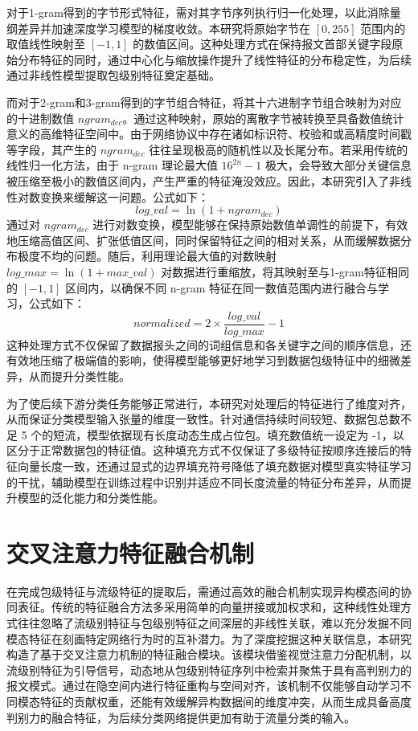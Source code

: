 对于1-gram得到的字节形式特征，需对其字节序列执行归一化处理，以此消除量纲差异并加速深度学习模型的梯度收敛。本研究将原始字节在 $[0, 255]$ 范围内的取值线性映射至 $[-1, 1]$ 的数值区间。这种处理方式在保持报文首部关键字段原始分布特征的同时，通过中心化与缩放操作提升了线性特征的分布稳定性，为后续通过非线性模型提取包级别特征奠定基础。

而对于2-gram和3-gram得到的字节组合特征，将其十六进制字节组合映射为对应的十进制数值 $ngram_{dec}$。通过这种映射，原始的离散字节被转换至具备数值统计意义的高维特征空间中。由于网络协议中存在诸如标识符、校验和或高精度时间戳等字段，其产生的 $ngram_{dec}$ 往往呈现极高的随机性以及长尾分布。若采用传统的线性归一化方法，由于 n-gram 理论最大值 $16^{2n}-1$ 极大，会导致大部分关键信息被压缩至极小的数值区间内，产生严重的特征淹没效应。因此，本研究引入了非线性对数变换来缓解这一问题。公式如下：
\begin{equation}
  log\_val = \ln(1 + ngram_{dec})
  \label{eq:log}
\end{equation}
通过对 $ngram_{dec}$ 进行对数变换，模型能够在保持原始数值单调性的前提下，有效地压缩高值区间、扩张低值区间，同时保留特征之间的相对关系，从而缓解数据分布极度不均的问题。随后，利用理论最大值的对数映射 $log\_max = \ln(1 + max\_val)$ 对数据进行重缩放，将其映射至与1-gram特征相同的 $[-1, 1]$ 区间内，以确保不同 n-gram 特征在同一数值范围内进行融合与学习，公式如下：
\begin{equation}
  normalized = 2 \times \frac{log\_val}{log\_max} - 1
  \label{eq:normalized}
\end{equation}
这种处理方式不仅保留了数据报头之间的词组信息和各关键字之间的顺序信息，还有效地压缩了极端值的影响，使得模型能够更好地学习到数据包级特征中的细微差异，从而提升分类性能。

为了使后续下游分类任务能够正常进行，本研究对处理后的特征进行了维度对齐，从而保证分类模型输入张量的维度一致性。针对通信持续时间较短、数据包总数不足 5 个的短流，模型依据现有长度动态生成占位包。填充数值统一设定为 -1，以区分于正常数据包的特征值。这种填充方式不仅保证了多级特征按顺序连接后的特征向量长度一致，还通过显式的边界填充符号降低了填充数据对模型真实特征学习的干扰，辅助模型在训练过程中识别并适应不同长度流量的特征分布差异，从而提升模型的泛化能力和分类性能。

\section{交叉注意力特征融合机制}
在完成包级特征与流级特征的提取后，需通过高效的融合机制实现异构模态间的协同表征。传统的特征融合方法多采用简单的向量拼接或加权求和，这种线性处理方式往往忽略了流级别特征与包级别特征之间深层的非线性关联，难以充分发掘不同模态特征在刻画特定网络行为时的互补潜力。为了深度挖掘这种关联信息，本研究构造了基于交叉注意力机制的特征融合模块。该模块借鉴视觉注意力分配机制，以流级别特征为引导信号，动态地从包级别特征序列中检索并聚焦于具有高判别力的报文模式。通过在隐空间内进行特征重构与空间对齐，该机制不仅能够自动学习不同模态特征的贡献权重，还能有效缓解异构数据间的维度冲突，从而生成具备高度判别力的融合特征，为后续分类网络提供更加有助于流量分类的输入。

